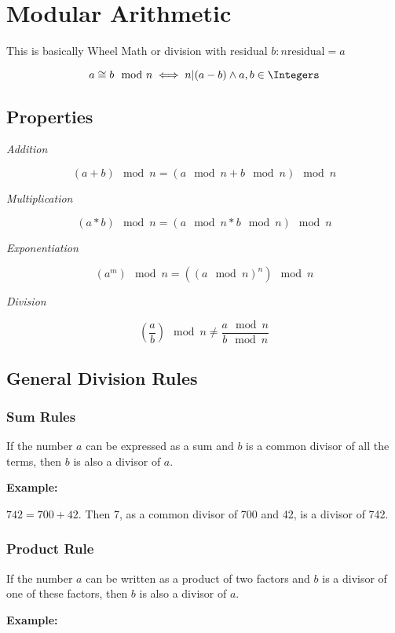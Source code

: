 \newpage
\section{Modular Arithmetic}

This is basically Wheel Math or division with residual \(b : n \text{residual} = a\)

\[
    a \cong b \mod n \iff n | (a - b) \land  a,b \in \Integers
\]

\subsection{Properties}

\emph{Addition}

\[
    (a + b) \mod n = (a \mod n + b \mod n) \mod n
\]

\emph{Multiplication}

\[
    (a * b) \mod n = (a \mod n * b \mod n) \mod n
\]

\emph{Exponentiation}

\[
    (a^m) \mod n = ({(a \mod n)}^n) \mod n
\]

\emph{Division}

\[
    (\frac{a}{b}) \mod n \ne  \frac{a \mod n}{b \mod n}
\]

\subsection{General Division Rules}

\subsubsection{Sum Rules}

If the number \(a\) can be expressed as a sum and \(b\) is a common divisor of all the terms, 
then \(b\) is also a divisor of \(a\).

\textbf{Example:} 

\( 742 = 700 + 42 \). Then 7, as a common divisor of 700 and 42, is a divisor of 742.

\subsubsection{Product Rule}

If the number \(a\) can be written as a product of two factors and \(b\) is a divisor of one of these 
factors, then \(b\) is also a divisor of \(a\).

\textbf{Example:}

